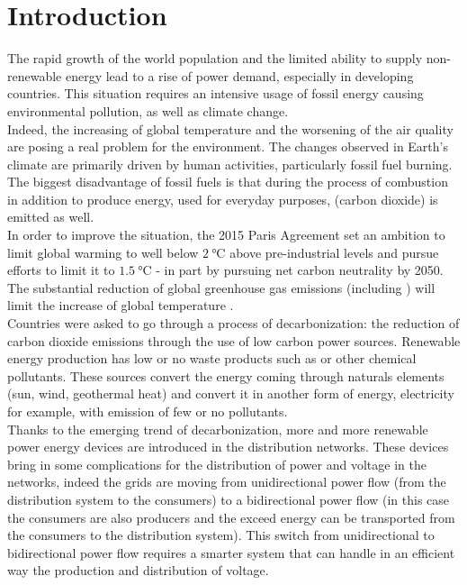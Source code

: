 \chapter{Introduction}

%
The rapid growth of the world population and the limited ability to supply non-renewable energy lead to a rise of power demand, especially in developing countries. This situation requires an intensive usage of fossil energy causing environmental pollution, as well as climate change. \\

Indeed, the increasing of global temperature and the worsening of the air quality are posing a real problem for the environment. The changes observed in Earth’s climate are primarily driven by human activities, particularly fossil fuel burning. The biggest disadvantage of fossil fuels is that during the process of combustion in addition to produce energy, used for everyday purposes,  (carbon dioxide) is emitted as well.\\

In order to improve the situation, the 2015 Paris Agreement set an ambition to limit global warming to well below $\SI{2}{\degreeCelsius}$ above pre-industrial levels and pursue efforts to limit it to $\SI{1.5}{\degreeCelsius}$ - in part by pursuing net carbon neutrality by 2050. The substantial reduction of global greenhouse gas emissions (including )  will limit the increase of global temperature \cite{french_conference}. \\
Countries were asked to go through a process of decarbonization: the reduction of carbon dioxide emissions through the use of low carbon power sources. Renewable energy production has low or no waste products such as  or other chemical pollutants. 
These sources convert the energy coming through naturals elements (sun, wind, geothermal heat) and convert it in another form of energy, electricity for example, with emission of few or no pollutants.\\

Thanks to the emerging trend of decarbonization, more and more renewable power energy devices are introduced in the distribution networks. These devices bring in some complications for the distribution of power and voltage in the networks, indeed the grids are moving from unidirectional power flow (from the distribution system to the consumers) to a bidirectional power flow (in this case the consumers are also producers and the exceed energy can be transported from the consumers to the distribution system). This switch from unidirectional to bidirectional power flow requires a smarter system that can handle in an efficient way the production and distribution of voltage.\\

